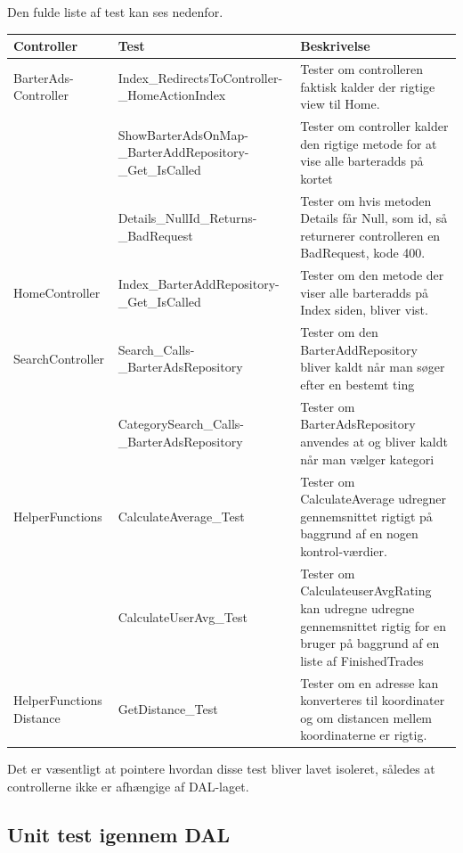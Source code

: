 Den fulde liste af test kan ses nedenfor.
\setlength{\arrayrulewidth}{0.3mm}
\setlength{\tabcolsep}{2pt}
\renewcommand{\arraystretch}{1.5}
\begin{table}[H]
	\begin{tabular}{ | p{3.0cm} | p{5.5cm} | p{8.0cm} | }
		\hline
		\textbf{Controller} & \textbf{Test} & \textbf{Beskrivelse} \\
		\hline
		BarterAds-Controller &  Index\_RedirectsToController-\_HomeActionIndex & Tester om controlleren faktisk kalder der rigtige view til Home. \\
		
		& ShowBarterAdsOnMap-\_BarterAddRepository-\_Get\_IsCalled & Tester om controller kalder den rigtige metode for at vise alle barteradds på kortet\\
	
		& Details\_NullId\_Returns-\_BadRequest & Tester om hvis metoden Details får Null, som id, så returnerer controlleren en BadRequest, kode 400. \\
		\hline
		HomeController & Index\_BarterAddRepository-\_Get\_IsCalled & Tester om den metode der viser alle barteradds på Index siden, bliver vist. \\
		\hline
		SearchController & Search\_Calls-\_BarterAdsRepository & Tester om den BarterAddRepository bliver kaldt når man søger efter en bestemt ting \\
		& CategorySearch\_Calls-\_BarterAdsRepository & Tester om BarterAdsRepository anvendes at og bliver kaldt når man vælger kategori \\
		\hline
		HelperFunctions & CalculateAverage\_Test & Tester om CalculateAverage udregner gennemsnittet rigtigt på baggrund af en nogen kontrol-værdier. \\ &  CalculateUserAvg\_Test & Tester om CalculateuserAvgRating kan udregne udregne gennemsnittet rigtig for en bruger på baggrund af en liste af FinishedTrades\\
		\hline
		HelperFunctions Distance & GetDistance\_Test & Tester om en adresse kan konverteres til koordinater og om distancen mellem koordinaterne er rigtig.\\
		\hline
	\end{tabular}
\end{table}

Det er væsentligt at pointere hvordan disse test bliver lavet isoleret, således at controllerne ikke er afhængige af DAL-laget.

\subsection{Unit test igennem DAL}

